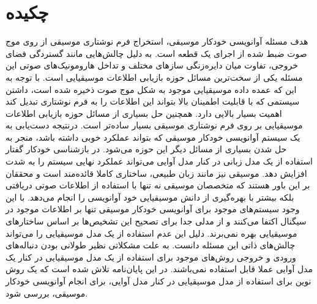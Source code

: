 \chapter*{چکیده}
هدف مسئله آوانویسی خودکار موسیقی، استخراج فرم نوشتاری موسیقی از روی موج صوت ضبط
شده از اجرای یک قطعه است. به دلیل چالش‌هایی مانند گستردگی فضای خروجی، تفاوت میان
دایره‌زنگی سازهای مختلف و تداخل هارومونیک‌های صوتی این مسئله یکی از سخت‌ترین
مسائل حوزه بازیابی اطلاعات موسیقیایی است. با توجه به این که عمده داده موسیقیایی
موجود به شکل موج صوت ذخیره شده است، داشتن سیستمی که با قابلیت اطمینان بالا
بتواند این اطلاعات را به فرم نوشتاری تبدیل کند اهمیت بسیار بالایی دارد. همچنین
حل بسیاری از مسائل حوزه بازیابی اطلاعات موسیقیایی بر روی فرم نوشتاری موسیقی
بسیار ساده‌تر است. درنتیجه دست‌یابی به یک سیستم آوانویسی خودکار موسیقی که بتواند
عملکرد خوبی داشته باشد، منجر به حل شدن بسیاری از مسائل دیگر این حوزه می‌شود. در
بازشناسی خودکار گفتار استفاده از یک مدل زبانی در کنار مدل آوایی می‌تواند عملکرد
نهایی سیستم را به شدت افزایش دهد. موسیقی نیز مانند زبان طبیعی، ساختاری کاملا
قائده‌مند است و محققان بر این باور هستند که متخصصان موسیقی نه تنها با استفاده از
اطلاعات صوتی دریافتی بلکه بیشتر با بهره‌گیری از دانش موسیقیایی خود آوانویسی را
انجام می‌دهد. با این وجود سیستم‌های موجود برای آوانویسی خودکار موسیقی تنها بر
اطلاعات موجود در سیگنال اکتفا می‌کنند و از مدلی جدا برای تصحیح این تشخیص‌ها بر
اساس ساختارهای موسیقیایی بهره نمی‌برند. دلیل این عدم استفاده از یک مدل موسیقیایی
را می‌تواند چالش‌های ذاتی این مسئله دانست. به علت مشکلاتی نظیر طولانی بودن
دنباله‌های ورودی و خروجی روش‌های موجود برای استفاده از یک مدل موسیقیایی در کنار
یک مدل آوایی عملا قابل استفاده نمی‌باشند. در این پایان‌نامه تلاش شده است که یک
روش نوین برای استفاده از مدل موسیقیایی در کنار مدل آوایی، برای انجام آوانویسی
خودکار موسیقی، بررسی شود.